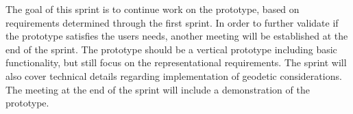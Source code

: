 The goal of this sprint is to continue work on the prototype, based on requirements determined through the first sprint. In order to further validate if the prototype satisfies the users needs, another meeting will be established at the end of the sprint. The prototype should be a vertical prototype including basic functionality, but still focus on the representational requirements. The sprint will also cover technical details regarding implementation of geodetic considerations. The meeting at the end of the sprint will include a demonstration of the prototype.